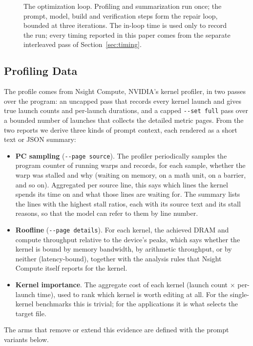 \begin{figure}[t]
\centering
\resizebox{\textwidth}{!}{}
\caption{The optimization loop. Profiling and summarization run once; the prompt, model, build and
  verification steps form the repair loop, bounded at three iterations. The in-loop time is used only
  to record the run; every timing reported in this paper comes from the separate interleaved pass of
  Section~\ref{sec:timing}.}
\label{fig:pipeline}
\end{figure}

\subsection{Profiling Data}
\label{sec:profdata}
The profile comes from Nsight Compute, NVIDIA's kernel profiler, in two passes over the program: an
uncapped pass that records every kernel launch and gives true launch counts and per-launch durations,
and a capped \texttt{-{}-set full} pass over a bounded number of launches that collects the detailed
metric pages. From the two reports we derive three kinds of prompt context, each rendered as a short
text or JSON summary:
\begin{itemize}\itemsep2pt
  \item \textbf{PC sampling} (\texttt{-{}-page source}). The profiler periodically samples the program
    counter of running warps and records, for each sample, whether the warp was stalled and why (waiting
    on memory, on a math unit, on a barrier, and so on). Aggregated per source line, this says which
    lines the kernel spends its time on and what those lines are waiting for. The summary lists the
    lines with the highest stall ratios, each with its source text and its stall reasons, so that the
    model can refer to them by line number.
  \item \textbf{Roofline} (\texttt{-{}-page details}). For each kernel, the achieved DRAM and compute
    throughput relative to the device's peaks, which says whether the kernel is bound by memory
    bandwidth, by arithmetic throughput, or by neither (latency-bound), together with the analysis rules
    that Nsight Compute itself reports for the kernel.
  \item \textbf{Kernel importance}. The aggregate cost of each kernel (launch count $\times$ per-launch
    time), used to rank which kernel is worth editing at all. For the single-kernel benchmarks this is
    trivial; for the applications it is what selects the target file.
\end{itemize}
The arms that remove or extend this evidence are defined with the prompt variants below.

